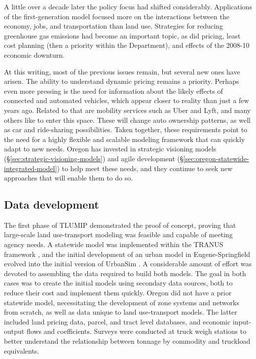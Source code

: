 A little over a decade later the policy focus had shifted considerably. Applications of the first-generation model focused more on the interactions between the economy, jobs, and transportation than land use. Strategies for reducing greenhouse gas emissions had become an important topic, as did pricing, least cost planning (then a priority within the Department), and effects of the 2008-10 economic downturn.

At this writing, most of the previous issues remain, but several new ones have arisen. The ability to understand dynamic pricing remains a priority. Perhaps even more pressing is the need for information about the likely effects of connected and automated vehicles, which appear closer to reality than just a few years ago. Related to that are mobility services such as Uber and Lyft, and many others like to enter this space. These will change auto ownership patterns, as well as car and ride-sharing possibilities. Taken together, these requirements point to the need for a highly flexible and scalable modeling framework that can quickly adapt to new needs. Oregon has invested in strategic visioning models (\S\ref{sec:strategic-visioning-models}) and agile development (\S\ref{sec:oregon-statewide-integrated-model}) to help meet these needs, and they continue to seek new approaches that will enable them to do so.

\subsection{Data development}

The first phase of TLUMIP demonstrated the proof of concept, proving that large-scale land use-transport modeling was feasible and capable of meeting agency needs. A statewide model was implemented within the TRANUS framework \citep{delabarra05}, and the initial development of an urban model in Eugene-Springfield evolved into the initial version of UrbanSim \citep{waddell02}. A considerable amount of effort was devoted to assembling the data required to build both models. The goal in both cases was to create the initial models using secondary data sources, both to reduce their cost and implement them quickly. Oregon did not have a prior statewide model, necessitating the development of zone systems and networks from scratch, as well as data unique to land use-transport models. The latter included land pricing data, parcel, and tract level databases, and economic input-output flows and coefficients. Surveys were conducted at truck weigh stations to better understand the relationship between tonnage by commodity and truckload equivalents.


